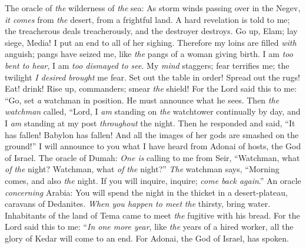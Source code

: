 \begin{biblechapter} %
 The oracle of \textit{the} wilderness of \textit{the} sea: As storm winds passing over in the Negev, \textit{it comes} from \textit{the} desert, 
from a frightful land.
\verse A hard revelation is told to me; the treacherous deals treacherously, 
and the destroyer destroys. 
Go up, Elam; 
lay siege, Media! I put an end to all of her sighing.
\verse Therefore my loins are filled \textit{with} anguish; 
pangs have seized me, like \textit{the} pangs of a woman giving birth. 
I am \textit{too bent to hear}, 
I am \textit{too dismayed to see}.
\verse My \textit{mind} staggers; fear terrifies me; 
the twilight \textit{I desired} \textit{brought} me fear.
\verse Set out the table in order! 
Spread out the rugs! 
Eat! drink! 
Rise up, commanders; 
smear \textit{the} shield!
\verse For the Lord said this to me:
\verse “Go, set \textit{a} watchman in position. 
He must announce what he sees.
\verse Then \textit{the} \textit{watchman} called,
\verse “Lord, I \textit{am} standing on \textit{the} watchtower continually by day, 
and I \textit{am} standing at my post \textit{throughout} the night. Then he responded and said,
\verse “It has fallen! Babylon has fallen! 
And all the images of her gods are smashed on the ground!” I will announce to you what I have heard from Adonai of hosts, the God of Israel.
 The oracle of Dumah: \textit{One is} calling to me from Seir, “Watchman, what \textit{of} \textit{the} night? 
Watchman, what \textit{of} \textit{the} night?”
\verse \textit{The} watchman says, “Morning comes, 
and also \textit{the} night. 
If you will inquire, inquire; 
\textit{come back again}.”
 An oracle \textit{concerning} Arabia:
\verse You will spend the night in the thicket in a desert-plateau, 
caravans of Dedanites.
\verse \textit{When you happen to meet} \textit{the} thirsty, bring water. 
Inhabitants of the land of Tema came to meet \textit{the} fugitive with his bread.
\verse For the Lord said this to me: “\textit{In one more year}, like \textit{the} years of a hired worker,
\verse all the glory of Kedar will come to an end. For Adonai, the God of Israel, has spoken.
\end{biblechapter}

